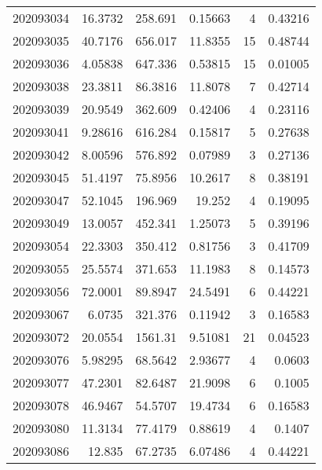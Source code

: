\begin{tabular}{rrrrrr}
 202093034 &         16.3732  &      258.691  &            0.15663 &           4 & 0.43216 \\
 202093035 &         40.7176  &      656.017  &           11.8355  &          15 & 0.48744 \\
 202093036 &          4.05838 &      647.336  &            0.53815 &          15 & 0.01005 \\
 202093038 &         23.3811  &       86.3816 &           11.8078  &           7 & 0.42714 \\
 202093039 &         20.9549  &      362.609  &            0.42406 &           4 & 0.23116 \\
 202093041 &          9.28616 &      616.284  &            0.15817 &           5 & 0.27638 \\
 202093042 &          8.00596 &      576.892  &            0.07989 &           3 & 0.27136 \\
 202093045 &         51.4197  &       75.8956 &           10.2617  &           8 & 0.38191 \\
 202093047 &         52.1045  &      196.969  &           19.252   &           4 & 0.19095 \\
 202093049 &         13.0057  &      452.341  &            1.25073 &           5 & 0.39196 \\
 202093054 &         22.3303  &      350.412  &            0.81756 &           3 & 0.41709 \\
 202093055 &         25.5574  &      371.653  &           11.1983  &           8 & 0.14573 \\
 202093056 &         72.0001  &       89.8947 &           24.5491  &           6 & 0.44221 \\
 202093067 &          6.0735  &      321.376  &            0.11942 &           3 & 0.16583 \\
 202093072 &         20.0554  &     1561.31   &            9.51081 &          21 & 0.04523 \\
 202093076 &          5.98295 &       68.5642 &            2.93677 &           4 & 0.0603  \\
 202093077 &         47.2301  &       82.6487 &           21.9098  &           6 & 0.1005  \\
 202093078 &         46.9467  &       54.5707 &           19.4734  &           6 & 0.16583 \\
 202093080 &         11.3134  &       77.4179 &            0.88619 &           4 & 0.1407  \\
 202093086 &         12.835   &       67.2735 &            6.07486 &           4 & 0.44221 \\

\end{tabular}
